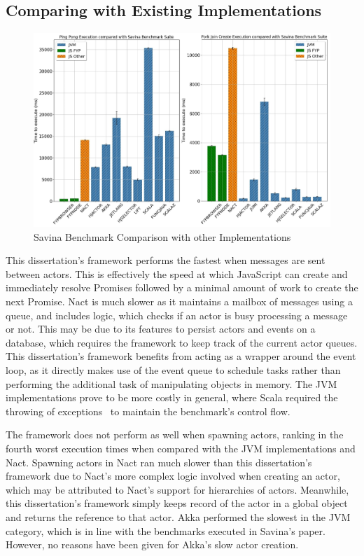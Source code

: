 \documentclass[oneside]{um-fict}
\begin{document}
\subsection{Comparing with Existing Implementations}
\begin{figure}[H]
    \begin{centering}
        \includegraphics[width=\textwidth]{resources/savina.png}
        \caption{Savina Benchmark Comparison with other Implementations}\label{fig:savina}
    \end{centering}
\end{figure}
This dissertation's framework performs the fastest when messages are sent between actors. This is effectively the speed at which JavaScript can create and immediately resolve Promises followed by a minimal amount of work to create the next Promise. Nact is much slower as it maintains a mailbox of messages using a queue, and includes logic, which checks if an actor is busy processing a message or not. This may be due to its features to persist actors and events on a database, which requires the framework to keep track of the current actor queues. This dissertation's framework benefits from acting as a wrapper around the event loop, as it directly makes use of the event queue to schedule tasks rather than performing the additional task of manipulating objects in memory. The JVM implementations prove to be more costly in general, where Scala required the throwing of exceptions~\cite{savina} to maintain the benchmark's control flow.

The framework does not perform as well when spawning actors, ranking in the fourth worst execution times when compared with the JVM implementations and Nact.  Spawning actors in Nact ran much slower than this dissertation's framework due to Nact's more complex logic involved when creating an actor, which may be attributed to Nact's support for hierarchies of actors. Meanwhile, this dissertation's framework simply keeps record of the actor in a global object and returns the reference to that actor. Akka performed the slowest in the JVM category, which is in line with the benchmarks executed in Savina's paper.  However, no reasons have been given for Akka's slow actor creation.
\end{document}
